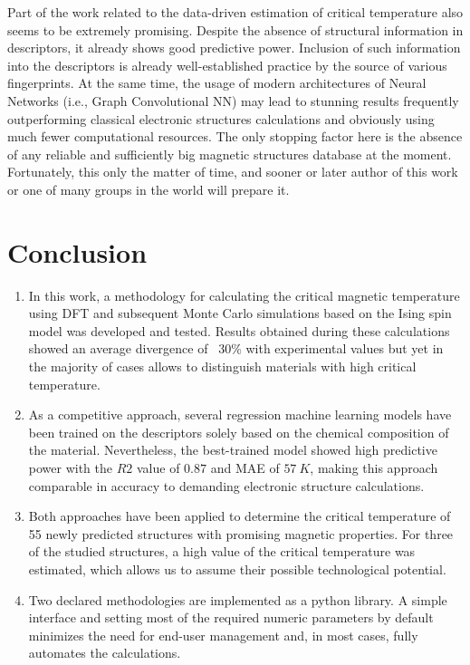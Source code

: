 Part of the work related to the data-driven estimation of critical temperature also seems to be extremely promising. Despite the absence of structural information in descriptors, it already shows good predictive power. Inclusion of such information into the descriptors is already well-established practice by the source of various fingerprints. At the same time, the usage of modern architectures of Neural Networks (i.e., Graph Convolutional NN) may lead to stunning results frequently outperforming classical electronic structures calculations and obviously using much fewer computational resources. The only stopping factor here is the absence of any reliable and sufficiently big magnetic structures database at the moment. Fortunately, this only the matter of time, and sooner or later author of this work or one of many groups in the world will prepare it.

\section{Conclusion}
\begin{enumerate}
\item In this work, a methodology for calculating the critical magnetic temperature using DFT and subsequent Monte Carlo simulations based on the Ising spin model was developed and tested. Results obtained during these calculations showed an average divergence of ~30\% with experimental values but yet in the majority of cases allows to distinguish materials with high critical temperature.

\item As a competitive approach, several regression machine learning models have been trained on the descriptors solely based on the chemical composition of the material. Nevertheless, the best-trained model showed high predictive power with the $R2$ value of $0.87$ and MAE of $57\ K$, making this approach comparable in accuracy to demanding electronic structure calculations.

\item Both approaches have been applied to determine the critical temperature of 55 newly predicted structures with promising magnetic properties. For three of the studied structures, a high value of the critical temperature was estimated, which allows us to assume their possible technological potential.

\item Two declared methodologies are implemented as a python library. A simple interface and setting most of the required numeric parameters by default minimizes the need for end-user management and, in most cases, fully automates the calculations.

\end{enumerate}






